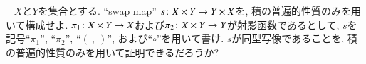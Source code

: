 \begin{exercise}~
\sexc $X$と$Y$を集合とする. ``swap map'' $s\colon X\times Y\rightarrow Y\times X$を, 積の普遍的性質のみを用いて構成せよ. $\pi_1\colon X\times Y\rightarrow X$および$\pi_2\colon X\times Y\rightarrow Y$が射影函数であるとして, $s$を記号``$\pi_1$'', ``$\pi_2$'', ``$(\ ,\ )$'', および``$\circ$''を用いて書け. 
\next $s$が同型写像であることを, 積の普遍的性質のみを用いて証明できるだろうか?
\endsexc
\end{exercise}

